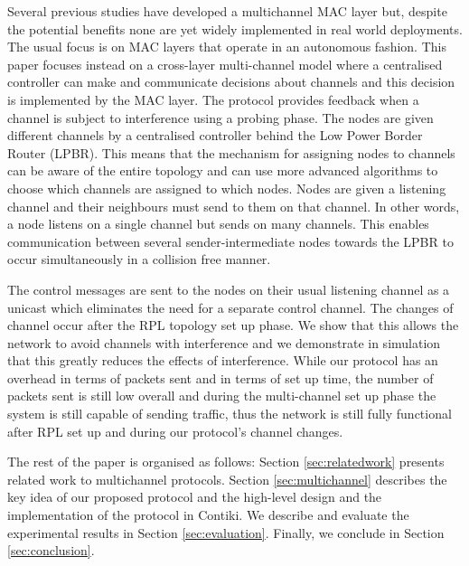 Several previous studies have developed a multichannel MAC layer but, despite the potential benefits none are yet widely implemented in real world deployments. The usual focus is on MAC layers that operate in an autonomous fashion. This paper focuses instead on a cross-layer multi-channel model where a centralised controller can make and communicate decisions about channels and this decision is implemented by the MAC layer.  The protocol provides feedback when a channel is subject to interference using a probing phase. The nodes are given different channels by a centralised controller behind the Low Power Border Router (LPBR). This means that the mechanism for assigning nodes to channels can be aware of the entire topology and can use more advanced algorithms to choose which channels are assigned to which nodes. Nodes are given a listening channel and their neighbours must send to them on that channel. In other words, a node listens on a single channel but sends on many channels. This enables communication between several sender-intermediate nodes towards the LPBR to occur simultaneously in a collision free manner.

The control messages are sent to the nodes on their usual listening channel as a unicast which eliminates the need for a separate control channel.
The changes of channel occur after the RPL topology set up phase. We show that this allows the network to avoid channels with interference and we demonstrate in simulation that this greatly reduces the effects of interference. While our protocol has an overhead in terms of packets sent and in terms of set up time, the number of packets sent is still low overall and during the multi-channel set up phase the system is still capable of sending traffic, thus the network is still fully functional after RPL set up and during our protocol's channel changes.

The rest of the paper is organised as follows: Section \ref{sec:relatedwork} presents related work to multichannel protocols. Section \ref{sec:multichannel} describes the key idea of our proposed protocol and the high-level design and the implementation of the protocol in Contiki. We describe and evaluate the experimental results in Section \ref{sec:evaluation}. Finally, we conclude in Section \ref{sec:conclusion}.
